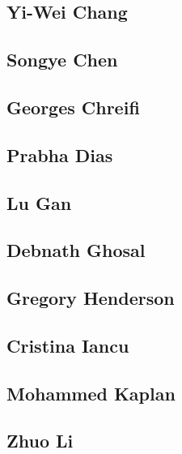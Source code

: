 \documentclass[]{tufte-book}
\begin{document}
\hypertarget{yi-wei_chang}{%
\subsection{Yi-Wei Chang}\label{yi-wei_chang}}

\hypertarget{songye_chen}{%
\subsection{Songye Chen}\label{songye_chen}}

\hypertarget{georges_chreifi}{%
\subsection{Georges Chreifi}\label{georges_chreifi}}

\hypertarget{prabha_dias}{%
\subsection{Prabha Dias}\label{prabha_dias}}

\hypertarget{lu_gan}{%
\subsection{Lu Gan}\label{lu_gan}}

\hypertarget{debnath_ghosal}{%
\subsection{Debnath Ghosal}\label{debnath_ghosal}}

\hypertarget{gregory_henderson}{%
\subsection{Gregory Henderson}\label{gregory_henderson}}

\hypertarget{cristina_iancu}{%
\subsection{Cristina Iancu}\label{cristina_iancu}}

\hypertarget{mohammed_kaplan}{%
\subsection{Mohammed Kaplan}\label{mohammed_kaplan}}

\hypertarget{zhuo_li}{%
\subsection{Zhuo Li}\label{zhuo_li}}
\end{document}
